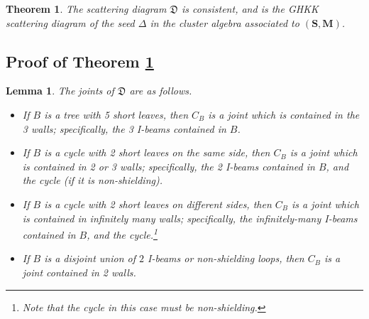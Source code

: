 \documentclass{amsart}
\newtheorem{theorem}[proposition]{Theorem}
\newtheorem{lemma}[proposition]{Lemma}
\theoremstyle{definition}
\theoremstyle{remark}
\numberwithin{equation}{section}
\newcommand{\0}{{\mathbf{0}}}
\newcommand{\M}{\mathbf{M}}
\renewcommand{\S}{\mathbf{S}}
\begin{document}
\begin{theorem}\label{thm: consistent}
The scattering diagram $\mathfrak{D}$ is consistent, and is the GHKK scattering diagram of the seed $\Delta$ in the cluster algebra associated to $(\S,\M)$.
\end{theorem}

\subsection{Proof of Theorem \ref{thm: consistent}}

\begin{lemma}
The joints of $\mathfrak{D}$ are as follows.%
\begin{itemize}
	\item If $B$ is a tree with 5 short leaves, then $C_B$ is a joint which is contained in the 3 walls; specifically, the 3 I-beams contained in $B$.
	\item If $B$ is a cycle with 2 short leaves on the same side, then $C_B$ is a joint which is contained in 2 or 3 walls; specifically, the 2 I-beams contained in $B$, and the cycle (if it is non-shielding).
	\item If $B$ is a cycle with 2 short leaves on different sides, then $C_B$ is a joint which is contained in infinitely many walls; specifically, the infinitely-many I-beams contained in $B$, and the cycle.\footnote{Note that the cycle in this case must be non-shielding.}
	\item If $B$ is a disjoint union of $2$ I-beams or non-shielding loops, then $C_B$ is a joint contained in 2 walls.
\end{itemize}
\end{lemma}
\end{document}
